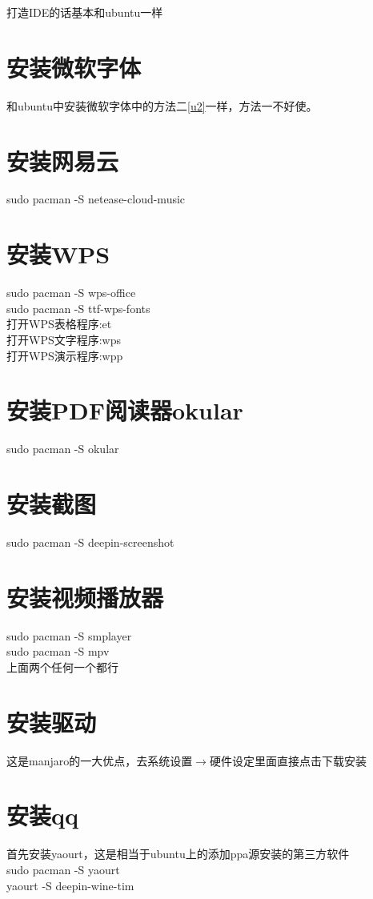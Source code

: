 \documentclass[utf8]{book}
\begin{document}
\begin{appendices}
	打造IDE的话基本和ubuntu一样
	
	\section{安装微软字体}\label{m5}
	和ubuntu中安装微软字体中的方法二\ref{u2}一样，方法一不好使。
	\section{安装网易云}\label{m6}
	sudo pacman -S netease-cloud-music
	
	\section{安装WPS}\label{m7}
	\indent sudo pacman -S wps-office\\
	\indent sudo pacman -S ttf-wps-fonts\\
	\indent 打开WPS表格程序:et\\
	\indent 打开WPS文字程序:wps\\
	\indent 打开WPS演示程序:wpp\\
	
	\section{安装PDF阅读器okular}\label{m8}
	sudo pacman -S okular
	
	\section{安装截图}\label{m9}
	sudo pacman -S deepin-screenshot
	
	\section{安装视频播放器}\label{m10}
	
	sudo pacman -S smplayer\\
	\indent sudo pacman -S mpv\\
	\indent 上面两个任何一个都行
	
	\section{安装驱动}\label{m11}
	
	这是manjaro的一大优点，去系统设置$\longrightarrow$硬件设定里面直接点击下载安装
	
	\section{安装qq}\label{m12}
	首先安装yaourt，这是相当于ubuntu上的添加ppa源安装的第三方软件\\
	sudo pacman -S yaourt\\
	yaourt -S deepin-wine-tim\\
	

\end{appendices}
\end{document}
